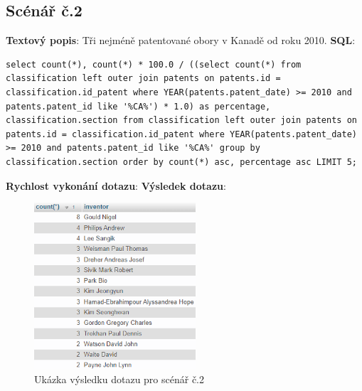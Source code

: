 \subsection{Scénář č.2}
\textbf{Textový popis}: Tři nejméně patentované obory v Kanadě od roku 2010.
\newline
\textbf{SQL}: 
\begin{lstlisting}[label = {lst:elements_a}]
select count(*), count(*) * 100.0 / ((select count(*) from classification left outer join patents on patents.id = classification.id_patent where YEAR(patents.patent_date) >= 2010 and patents.patent_id like '%CA%') * 1.0) as percentage, classification.section from classification left outer join patents on patents.id = classification.id_patent where YEAR(patents.patent_date) >= 2010 and patents.patent_id like '%CA%' group by classification.section order by count(*) asc, percentage asc LIMIT 5;
\end{lstlisting}
\textbf{Rychlost vykonání dotazu}: 
\newline
\textbf{Výsledek dotazu}:
\begin{figure}[H]
\centering
\includegraphics[width=6cm]{img/scenare/scenar_9}
\caption{Ukázka výsledku dotazu pro scénář č.2}
\label{fig:scenar2}
\end{figure}

